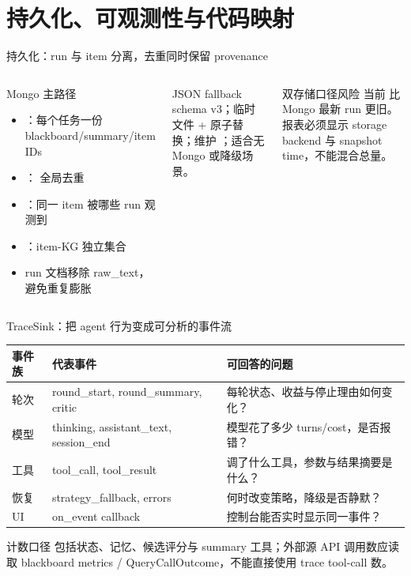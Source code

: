 \section{持久化、可观测性与代码映射}

\begin{frame}{持久化：run 与 item 分离，去重同时保留 provenance}
\begin{columns}[T,onlytextwidth]
\begin{block}{Mongo 主路径}
\begin{itemize}
  \item {}：每个任务一份 blackboard/summary/item IDs
  \item {}： 全局去重
  \item {}：同一 item 被哪些 run 观测到
  \item {}：item-KG 独立集合
  \item run 文档移除 raw\_text，避免重复膨胀
\end{itemize}
\end{block}
\begin{block}{JSON fallback}
schema v3；临时文件 + 原子替换；维护 ；适合无 Mongo 或降级场景。
\end{block}
\begin{alertblock}{双存储口径风险}
当前  比 Mongo 最新 run 更旧。报表必须显示 storage backend 与 snapshot time，不能混合总量。
\end{alertblock}
\end{columns}
\end{frame}

\begin{frame}{TraceSink：把 agent 行为变成可分析的事件流}
\scriptsize
\begin{tabularx}{\textwidth}{p{} X X}
\toprule
事件族 & 代表事件 & 可回答的问题 \\
\midrule
轮次 & round\_start, round\_summary, critic & 每轮状态、收益与停止理由如何变化？ \\
模型 & thinking, assistant\_text, session\_end & 模型花了多少 turns/cost，是否报错？ \\
工具 & tool\_call, tool\_result & 调了什么工具，参数与结果摘要是什么？ \\
恢复 & strategy\_fallback, errors & 何时改变策略，降级是否静默？ \\
UI & on\_event callback & 控制台能否实时显示同一事件？ \\
\bottomrule
\end{tabularx}

\vspace{0.2em}
\begin{alertblock}{计数口径}
 包括状态、记忆、候选评分与 summary 工具；外部源 API 调用数应读取 blackboard metrics / QueryCallOutcome，不能直接使用 trace tool-call 数。
\end{alertblock}
\end{frame}


